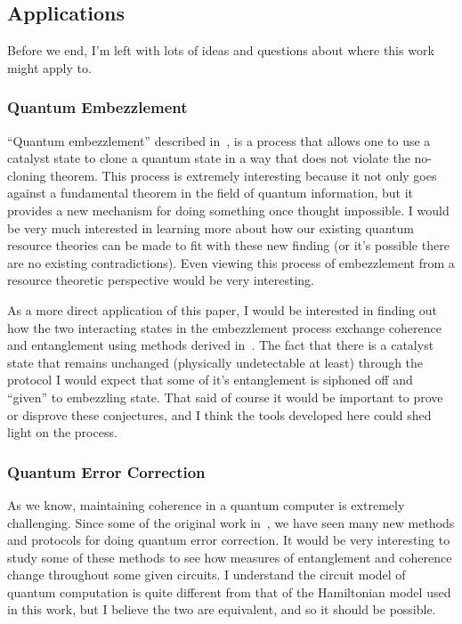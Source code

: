 \documentclass[11pt,english]{article}
\theoremstyle{definition}
\begin{document}
\subsection{Applications}

Before we end, I'm left with lots of ideas and questions about where this work might apply to.

\subsubsection{Quantum Embezzlement}
``Quantum embezzlement'' described in~\cite{embezzlement,self-embezzlement}, is a process that allows one to use a catalyst state to clone a quantum state in a way that does not violate the no-cloning theorem. This process is extremely interesting because it not only goes against a fundamental theorem in the field of quantum information, but it provides a new mechanism for doing something once thought impossible. I would be very much interested in learning more about how our existing quantum resource theories can be made to fit with these new finding (or it's possible there are no existing contradictions). Even viewing this process of embezzlement from a resource theoretic perspective would be very interesting.

As a more direct application of this paper, I would be interested in finding out how the two interacting states in the embezzlement process exchange coherence and entanglement using methods derived in~\cite{dynamic-entropies}. The fact that there is a catalyst state that remains unchanged (physically undetectable at least) through the protocol I would expect that some of it's entanglement is siphoned off and ``given'' to embezzling state. That said of course it would be important to prove or disprove these conjectures, and I think the tools developed here could shed light on the process.

\subsubsection{Quantum Error Correction}
As we know, maintaining coherence in a quantum computer is extremely challenging. Since some of the original work in~\cite{error-correction}, we have seen many new methods and protocols for doing quantum error correction. It would be very interesting to study some of these methods to see how measures of entanglement and coherence change throughout some given circuits. I understand the circuit model of quantum computation is quite different from that of the Hamiltonian model used in this work, but I believe the two are equivalent, and so it should be possible.

\clearpage


\end{document}
